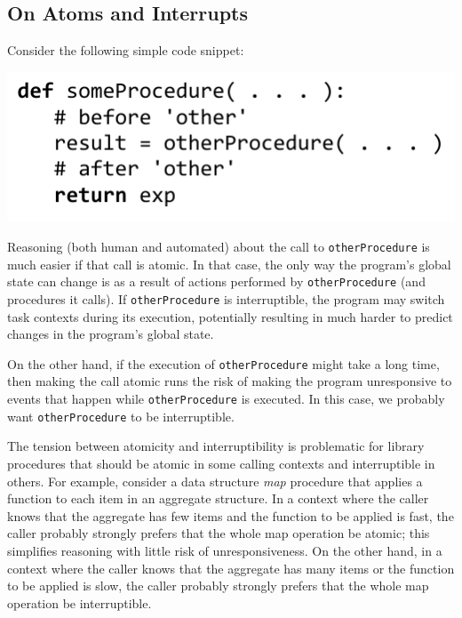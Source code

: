 \documentclass[9pt,preprint]{sigplanconf}
\begin{document}
\subsection{On Atoms and Interrupts}

Consider the following simple code snippet\footnotemark{}:

\noindent
\includegraphics[scale=0.7]{trivial_call}


Reasoning (both human and automated) about the call to \texttt{otherProcedure} is much easier if that call is atomic.
In that case, the only way the program's global state can change is as a result of actions performed by \texttt{otherProcedure} (and procedures it calls).
If \texttt{otherProcedure} is interruptible, the program may switch task contexts during its execution, potentially resulting in much harder to predict changes in the program's global state.

On the other hand, if the execution of \texttt{otherProcedure} might take a long time\footnotemark{}, then making the call atomic runs the risk of making the program unresponsive to events that happen while \texttt{otherProcedure} is executed.
In this case, we probably want \texttt{otherProcedure} to be interruptible.


The tension between atomicity and interruptibility is problematic for library procedures that should be atomic in some calling contexts and interruptible in others.
For example, consider a data structure \emph{map} procedure that applies a function to each item in an aggregate structure.
In a context where the caller knows that the aggregate has few items and the function to be applied is fast, the caller probably strongly prefers that the whole map operation be atomic; this simplifies reasoning with little risk of unresponsiveness.
On the other hand, in a context where the caller knows that the aggregate has many items or the function to be applied is slow, the caller probably strongly prefers that the whole map operation be interruptible.
\end{document}
